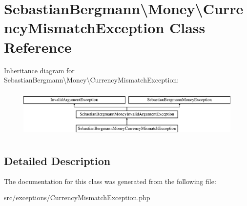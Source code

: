 \hypertarget{classSebastianBergmann_1_1Money_1_1CurrencyMismatchException}{}\section{Sebastian\+Bergmann\textbackslash{}Money\textbackslash{}Currency\+Mismatch\+Exception Class Reference}
\label{classSebastianBergmann_1_1Money_1_1CurrencyMismatchException}
Inheritance diagram for Sebastian\+Bergmann\textbackslash{}Money\textbackslash{}Currency\+Mismatch\+Exception\+:\begin{figure}[H]
\begin{center}
\leavevmode
\includegraphics[height=2.463343cm]{classSebastianBergmann_1_1Money_1_1CurrencyMismatchException}
\end{center}
\end{figure}


\subsection{Detailed Description}


The documentation for this class was generated from the following file\+:\begin{DoxyCompactItemize}
\item 
src/exceptions/Currency\+Mismatch\+Exception.\+php\end{DoxyCompactItemize}
